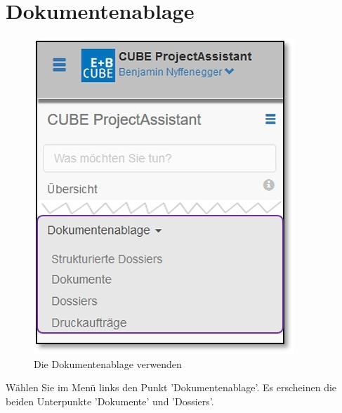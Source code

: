 
\clearpage
\section{Dokumentenablage}
\label{bkm:Ref434830029}\label{bkm:Ref434828324}

\begin{figure}   %
  \vspace{-35pt}      %
  \begin{center}
    \includegraphics[width=1\linewidth]{../chapters/11_Dokumentenablage/pictures/11_Menu_Dokumentenablage.jpg}
  \end{center}
  \vspace{-20pt}
  \caption{Die Dokumentenablage verwenden}
  \vspace{-10pt}
\end{figure}

Wählen Sie im Menü links den Punkt 'Dokumentenablage'. Es erscheinen die beiden Unterpunkte 'Dokumente' und 'Dossiers'.


